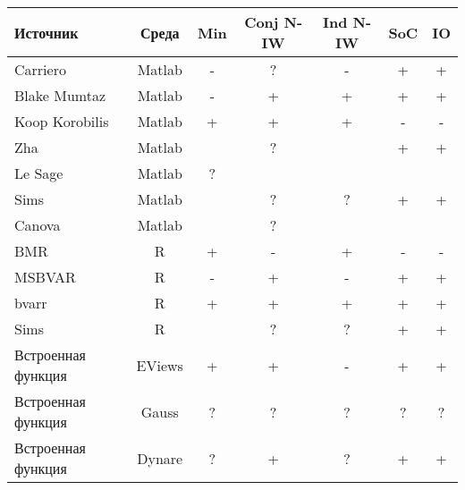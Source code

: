 \documentclass[11pt]{article} %
\begin{document}
\begin{center}
\begin{tabular}{p{4cm}cccccc}
\toprule
Источник&  Среда&Min &  Conj N-IW & Ind N-IW & SoC &IO\\
\midrule
Carriero&Matlab&-&?&-&+&+ \\
Blake Mumtaz&Matlab&-&+&+&+&+ \\
Koop Korobilis&Matlab  & + & +  & + &- &- \\
Zha&Matlab&&?&&+&+\\
Le Sage&Matlab&?&&&&\\
Sims&Matlab&&?&?&+&+\\
Canova&Matlab&&?&&&\\
BMR&R& + & - & + & - & -  \\
MSBVAR&R & - & + & - & + & +  \\
bvarr&R  & + & + & + & + & +  \\
Sims&R&&?&?&+&+\\
Встроенная функция&EViews& + & + & - &+ &+ \\
Встроенная функция&Gauss& ? & ?& ?& ?&?  \\
Встроенная функция&Dynare& ? & +& ?& +&+  \\
\bottomrule
\end{tabular}
\end{center}
\end{document}
